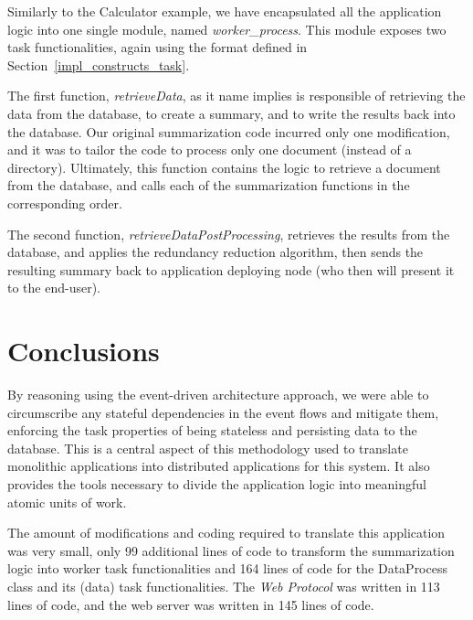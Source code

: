 \documentclass[12pt, titlepage]{uo_temp}
\begin{document}
     Similarly to the Calculator example, we have encapsulated all the application logic
     into one single module, named \emph{worker_process}. This module exposes two task
     functionalities, again using the format defined in Section~\ref{impl_constructs_task}. 

     The first function, \emph{retrieveData}, as it name implies is responsible of
     retrieving the data from the database, to create a summary, and to write the results
     back into the database. Our original summarization code incurred only one
     modification, and it was to tailor the code to process only one document (instead of
     a directory). Ultimately, this function contains the logic to retrieve a document from
     the database, and calls each of the summarization functions in the corresponding
     order.
     
     The second function, \emph{retrieveDataPostProcessing}, retrieves the results from
     the database, and applies the redundancy reduction algorithm, then sends the
     resulting summary back to application deploying node (who then will present it to the
     end-user).
     
     
     \section{Conclusions}
     By reasoning using the event-driven architecture approach, we were able to
     circumscribe any stateful dependencies in the event flows and mitigate them,
     enforcing the task properties of being stateless and persisting data to the
     database. This is a central aspect of this methodology used to translate monolithic
     applications into distributed applications for this system. It also provides the
     tools necessary to divide the application logic into meaningful atomic units of
     work. 

     The amount of modifications and coding required to translate this application was
     very small, only 99 additional lines of code to transform the summarization logic
     into worker task functionalities and 164 lines of code for the DataProcess class and
     its (data) task functionalities. The \emph{Web Protocol} was written in 113 lines of
     code, and the web server was written in 145 lines of code.
     
\end{document}
